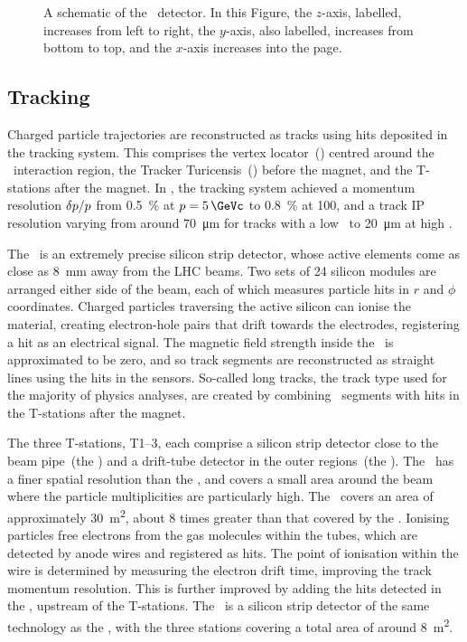 \begin{figure}
  \centering
  
  \caption{%
    A schematic of the \lhcb\ detector.
    In this Figure, the $z$-axis, labelled, increases from left to right, the 
    $y$-axis, also labelled, increases from bottom to top, and the $x$-axis 
    increases into the page.
  }
  \label{fig:intro:lhcb:detector}
\end{figure}

\subsection{Tracking}
\label{chap:intro:lhcb:detector:tracking}

Charged particle trajectories are reconstructed as tracks using hits deposited 
in the tracking system.
This comprises the vertex locator~(\velo) centred around the \pp\ interaction 
region, the Tracker Turicensis~(\ttracker) before the magnet, and the 
T-stations after the magnet.
In \runone, the tracking system achieved a momentum resolution 
$\delta{\ensuremath{p}}/p$ from \SI{0.5}{\percent} at $\ptot = \SI{5}{\GeVc}$ to 
\SI{0.8}{\percent} at \SI{100}{\GeVc}, and a track \acl{IP} resolution varying 
from around \SI{70}{\micro\metre} for tracks with a low \pT\ to 
\SI{20}{\micro\metre} at high \pT.

The \velo\ is an extremely precise silicon strip detector, whose active 
elements come as close as \SI{8}{\milli\metre} away from the \ac{LHC} beams.
Two sets of 24 silicon modules are arranged either side of the beam, each of 
which measures particle hits in $r$ and $\phi$ coordinates.
Charged particles traversing the active silicon can ionise the material, 
creating electron-hole pairs that drift towards the electrodes, registering a 
hit as an electrical signal.
The magnetic field strength inside the \velo\ is approximated to be zero, and 
so track segments are reconstructed as straight lines using the hits in the 
sensors.
So-called long tracks, the track type used for the majority of physics 
analyses, are created by combining \velo\ segments with hits in the T-stations 
after the magnet.

The three T-stations, T1--3, each comprise a silicon strip detector close to 
the beam pipe~(the \itracker) and a drift-tube detector in the outer 
regions~(the \otracker).
The \itracker\ has a finer spatial resolution than the \otracker, and covers a 
small area around the beam where the particle multiplicities are particularly 
high.
The \otracker\ covers an area of approximately \SI{30}{\metre\squared}, about 8 
times greater than that covered by the \itracker.
Ionising particles free electrons from the gas molecules within the tubes, 
which are detected by anode wires and registered as hits.
The point of ionisation within the wire is determined by measuring the electron 
drift time, improving the track momentum resolution.
This is further improved by adding the hits detected in the \ttracker, upstream 
of the T-stations.
The \ttracker\ is a silicon strip detector of the same technology as the 
\itracker, with the three stations covering a total area of around 
\SI{8}{\metre\squared}.

